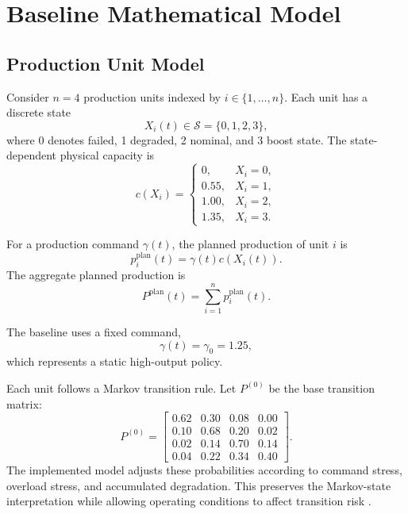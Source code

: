 \documentclass[journal]{IEEEtran}
\begin{document}
\section{Baseline Mathematical Model}
\label{sec:baseline_model}

\subsection{Production Unit Model}

Consider $n=4$ production units indexed by $i\in\{1,\ldots,n\}$. Each unit has a discrete state
\begin{equation}
X_i(t)\in\mathcal{S}=\{0,1,2,3\},
\end{equation}
where 0 denotes failed, 1 degraded, 2 nominal, and 3 boost state. The state-dependent physical capacity is
\begin{equation}
c(X_i)=
\begin{cases}
0, & X_i=0,\\
0.55, & X_i=1,\\
1.00, & X_i=2,\\
1.35, & X_i=3.
\end{cases}
\end{equation}

For a production command $\gamma(t)$, the planned production of unit $i$ is
\begin{equation}
p_i^{\mathrm{plan}}(t)=\gamma(t)c(X_i(t)).
\end{equation}
The aggregate planned production is
\begin{equation}
P^{\mathrm{plan}}(t)=\sum_{i=1}^{n} p_i^{\mathrm{plan}}(t).
\end{equation}

The baseline uses a fixed command,
\begin{equation}
\gamma(t)=\gamma_0=1.25,
\end{equation}
which represents a static high-output policy.

Each unit follows a Markov transition rule. Let $P^{(0)}$ be the base transition matrix:
\begin{equation}
P^{(0)}=
\begin{bmatrix}
0.62 & 0.30 & 0.08 & 0.00\\
0.10 & 0.68 & 0.20 & 0.02\\
0.02 & 0.14 & 0.70 & 0.14\\
0.04 & 0.22 & 0.34 & 0.40
\end{bmatrix}.
\end{equation}
The implemented model adjusts these probabilities according to command stress, overload stress, and accumulated degradation. This preserves the Markov-state interpretation while allowing operating conditions to affect transition risk \cite{viswanadham1992performance}.
\end{document}
